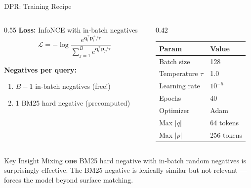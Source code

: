 \documentclass[aspectratio=169]{beamer}
\newif\ifanimated
\newcommand{\cpause}{\ifanimated\pause\fi}
\newcommand{\vq}{\mathbf{q}}
\newcommand{\vp}{\mathbf{p}}
\begin{document}
\begin{frame}{DPR: Training Recipe}
\begin{columns}[T]
\begin{column}{0.55\textwidth}
\textbf{Loss:} InfoNCE with in-batch negatives
$$\mathcal{L} = -\log \frac{e^{\vq_i^\top \vp_i^+/\tau}}{\sum_{j=1}^{B} e^{\vq_i^\top \vp_j / \tau}}$$

\vspace{0.5em}

\textbf{Negatives per query:}
\begin{enumerate}
    \item $B-1$ in-batch negatives (free!)
    \item 1 BM25 hard negative (precomputed)
\end{enumerate}
\end{column}

\begin{column}{0.42\textwidth}
\begin{table}
\footnotesize
\begin{tabular}{ll}
\toprule
\textbf{Param} & \textbf{Value} \\
\midrule
Batch size & 128 \\
Temperature $\tau$ & 1.0 \\
Learning rate & $10^{-5}$ \\
Epochs & 40 \\
Optimizer & Adam \\
Max $|q|$ & 64 tokens \\
Max $|p|$ & 256 tokens \\
\bottomrule
\end{tabular}
\end{table}
\end{column}
\end{columns}

\cpause
\vspace{0.5em}

\begin{exampleblock}{Key Insight}
Mixing \textbf{one} BM25 hard negative with in-batch random negatives is surprisingly effective. The BM25 negative is lexically similar but not relevant --- forces the model beyond surface matching.
\end{exampleblock}
\end{frame}
\end{document}
